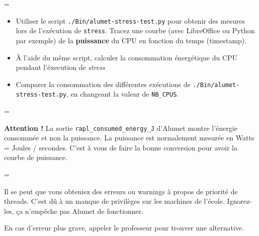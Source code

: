 \documentclass[a4paper,10pt]{article}
\newenvironment{warning}
  {\par\begin{mdframed}[linewidth=2pt,linecolor=orange]%
    \begin{list}{}{\leftmargin=1cm
                   \labelwidth=\leftmargin}\item[\emoji{warning}]}
  {\end{list}\end{mdframed}\par}
\newenvironment{information}
  {\par\begin{mdframed}[linewidth=2pt,linecolor=blue]%
    \begin{list}{}{\leftmargin=1cm
                   \labelwidth=\leftmargin}\item[\emoji{information}]}
  {\end{list}\end{mdframed}\par}
\newenvironment{question}
  {\par\begin{mdframed}[linewidth=2pt,linecolor=red]%
    \begin{list}{}{\leftmargin=1cm
                   \labelwidth=\leftmargin}\item[\emoji{red-question-mark}]}
  {\end{list}\end{mdframed}\par}
\newtheorem{question}{Question}
\begin{document}
\begin{question}
    \begin{itemize}
        \item Utiliser le script \texttt{./Bin/alumet-stress-test.py} pour
        obtenir des mesures lors de l'exécution de \texttt{stress}. Tracez une
        courbe (avec LibreOffice ou Python par exemple) de la \textbf{puissance}
        du CPU en fonction du temps (timestamp). 
        \item À l'aide du même script, calculer la consommation énergétique du
        CPU pendant l'éxecution de \textsl{stress}
        \item Comparer la consommation des différentes exécutions de
        \texttt{./Bin/alumet-stress-test.py}, en changeant la valeur de
        \texttt{NB\_CPUS}.
    \end{itemize}
\end{question}

\begin{warning}
\textbf{Attention !} La sortie \texttt{rapl\_consumed\_energy\_J} d'Alumet
montre l'énergie consommée et non la puissance. La puissance est normalement
mesurée en Watts = Joules / secondes. C'est à vous de faire la bonne conversion
pour avoir la courbe de puissance.
\end{warning}

\newpage


\begin{information}
    Il se peut que vous obteniez des erreurs ou warnings à propos de priorité de
  threads. C'est dû à un manque de privilèges sur les machines de l'école.
  Ignorez-les, ça n'empêche pas Alumet de fonctionner.
  
  En cas d'erreur plus grave, appeler le professeur pour trouver une alternative.
\end{information}
\end{document}
